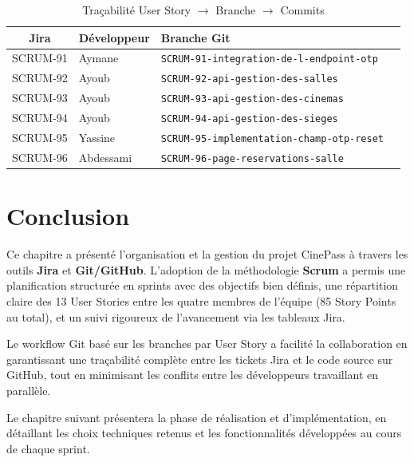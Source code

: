 \documentclass[12pt]{report}
\begin{document}
\begin{table}[H]
\centering
\label{tab:traceability}
\renewcommand{\arraystretch}{1.4}
\begin{tabular}{|c|l|l|l|}
\hline
\rowcolor{gray!20}
\textbf{Jira} & \textbf{Développeur}
              & \textbf{Branche Git} \\
\hline
SCRUM-91 & Aymane &
\texttt{SCRUM-91-integration-de-l-endpoint-otp} \\
\hline
SCRUM-92 & Ayoub &
\texttt{SCRUM-92-api-gestion-des-salles} \\
\hline
SCRUM-93 & Ayoub &
\texttt{SCRUM-93-api-gestion-des-cinemas} \\
\hline
SCRUM-94 & Ayoub &
\texttt{SCRUM-94-api-gestion-des-sieges} \\
\hline
SCRUM-95 & Yassine &
\texttt{SCRUM-95-implementation-champ-otp-reset} \\
\hline
SCRUM-96 & Abdessami &
\texttt{SCRUM-96-page-reservations-salle} \\
\hline
\end{tabular}
\caption{Traçabilité User Story $\rightarrow$ Branche $\rightarrow$ Commits}
\end{table}
 
 
\section{Conclusion}
 
Ce chapitre a présenté l'organisation et la gestion du
projet CinePass à travers les outils \textbf{Jira} et
\textbf{Git/GitHub}. L'adoption de la méthodologie
\textbf{Scrum} a permis une planification structurée en
sprints avec des objectifs bien définis, une répartition
claire des 13 User Stories entre les quatre membres de
l'équipe (85 Story Points au total), et un suivi rigoureux
de l'avancement via les tableaux Jira.
 
Le workflow Git basé sur les branches par User Story a
facilité la collaboration en garantissant une traçabilité
complète entre les tickets Jira et le code source sur
GitHub, tout en minimisant les conflits entre les
développeurs travaillant en parallèle.
 
Le chapitre suivant présentera la phase de réalisation
et d'implémentation, en détaillant les choix techniques
retenus et les fonctionnalités développées au cours de
chaque sprint.
 

\end{document}
